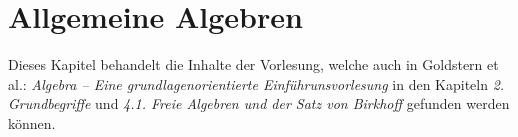 \chapter{Allgemeine Algebren}

Dieses Kapitel behandelt die Inhalte der Vorlesung, welche auch in Goldstern et al.: \textit{Algebra -- Eine grundlagenorientierte Einführunsvorlesung} in den Kapiteln \textit{2. Grundbegriffe} und \textit{4.1. Freie Algebren und der Satz von Birkhoff} gefunden werden können.





